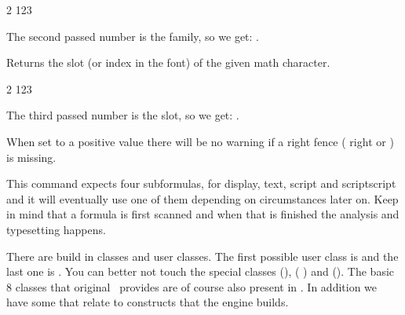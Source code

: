 \startbuffer
\the\mathcharfam{} 2 123
\stopbuffer

\typebuffer

The second passed number is the family, so we get: \inlinebuffer.

\stopnewprimitive

\startnewprimitive[title={\prm {mathcharslot}}]

Returns the slot (or index in the font) of the given math character.

\startbuffer
\the\mathcharslot{} 2 123
\stopbuffer

\typebuffer

The third passed number is the slot, so we get: \inlinebuffer.

\stopnewprimitive

\startnewprimitive[title={\prm {mathcheckfencesmode}}]

When set to a positive value there will be no warning if a right fence (\prm
{right} or ) is missing.

\stopnewprimitive

\startoldprimitive[title={\prm {mathchoice}}]

This command expects four subformulas, for display, text, script and scriptscript
and it will eventually use one of them depending on circumstances later on. Keep
in mind that a formula is first scanned and when that is finished the analysis
and typesetting happens.

\stopoldprimitive

\startnewprimitive[title={\prm {mathclass}}]

There are build in classes and user classes. The first possible user class is
 and the last one is
. You can better not touch
the special classes  (\number \mathallcode),  (\number
\mathbegincode) and  (\number \mathendcode). The basic 8 classes that
original \TEX\ provides are of course also present in \LUAMETATEX. In addition we
have some that relate to constructs that the engine builds.

